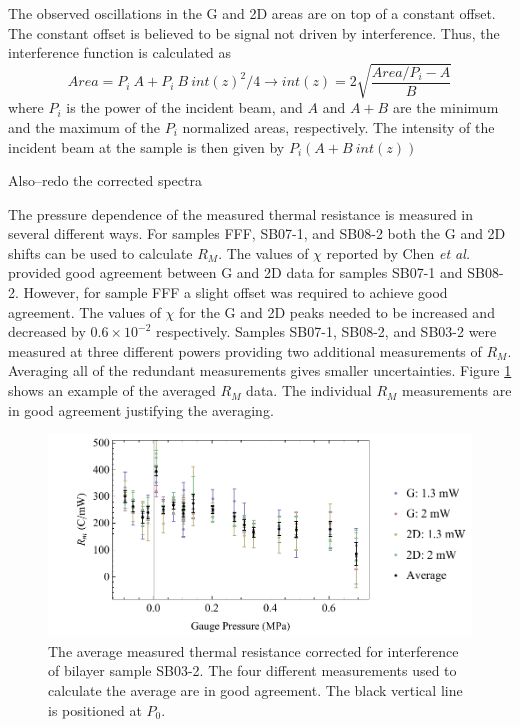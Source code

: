 The observed oscillations in the G and 2D areas are on top of a constant offset.
The constant offset is believed to be signal not driven by interference.
Thus, the interference function is calculated as
\begin{equation*}
	Area=P_i \ A+P_i \ B\ int(z)^2/4 \rightarrow  int(z)=2\sqrt{\frac{Area/P_i-A}{B}}
\end{equation*}
where $P_i$ is the power of the incident beam, and $A$ and $A+B$ are the minimum and the maximum of the $P_i$ normalized areas, respectively.
The intensity of the incident beam at the sample is then given by $P_i(A+ B \ int(z))$

Also--redo the corrected spectra

The pressure dependence of the measured thermal resistance is measured in several different ways.
For samples FFF, SB07-1, and SB08-2 both the G and 2D shifts can be used to calculate $R_M$.
The values of $\chi$ reported by Chen \textit{et al.} \cite{Chen2011a} provided good agreement between G and 2D data for samples SB07-1 and SB08-2.
However, for sample FFF a slight offset was required to achieve good agreement.
The values of $\chi$ for the G and 2D peaks needed to be increased and decreased by $0.6 \times 10^{-2}$ respectively.
Samples SB07-1, SB08-2, and SB03-2 were measured at three different powers providing two additional measurements of $R_M$.
Averaging all of the redundant measurements gives smaller uncertainties.
Figure \ref{fig:therm:R_average} shows an example of the averaged $R_M$ data.
The individual $R_M$ measurements are in good agreement justifying the averaging.

\begin{figure}
	\begin{center}
	\includegraphics[scale=0.8]{Figs_Thermal/R_average.pdf}
	\end{center}
	\caption[Average pressure dependence of the measured thermal resistance]{\label{fig:therm:R_average}
		The average measured thermal resistance corrected for interference of bilayer sample SB03-2.
		The four different measurements used to calculate the average are in good agreement.
		The black vertical line is positioned at $P_0$.
	}
\end{figure}

